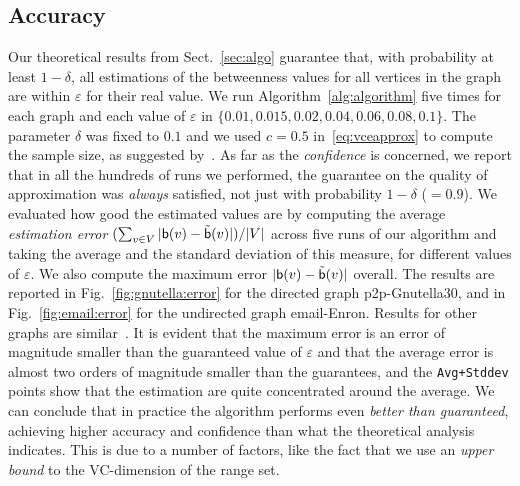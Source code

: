 \subsection{Accuracy}\label{sec:accuracy}
Our theoretical results from Sect.~\ref{sec:algo} guarantee that, with probability
at least $1-\delta$, all estimations of the betweenness values for all vertices
in the graph are within $\varepsilon$ for their real value. %
We run Algorithm~\ref{alg:algorithm} five times for each graph and each value of
$\varepsilon$ in $\{0.01, 0.015, 0.02, 0.04, 0.06, 0.08, 0.1\}$. The parameter
$\delta$ was fixed to $0.1$ and we used $c=0.5$ in~\eqref{eq:vceapprox} to
compute the sample size, as suggested by~\citet{LofflerP09}. As far as the
\emph{confidence} is concerned, we report that in all the hundreds of runs we
performed, the guarantee on the quality of approximation was \emph{always} satisfied, not just
with probability $1-\delta$ ($=0.9$). We evaluated how good the estimated values
are by computing the average \emph{estimation error} $(\sum_{v\in
V}|\mathsf{b}(v)-\tilde{\mathsf{b}}(v)|)/|V|$ across five runs of our algorithm and taking
the average and the standard deviation of this measure, for different values of
$\varepsilon$. We also compute the maximum error $|\mathsf{b}(v)-\tilde{\mathsf{b}}(v)|$
overall. The results are reported in Fig.~\ref{fig:gnutella:error} for the directed
graph p2p-Gnutella30, and in Fig.~\ref{fig:email:error} for the undirected graph
email-Enron. Results for other graphs are similar~\citep{RiondatoK13}. It is
evident that the maximum error is an error of magnitude smaller than the
guaranteed value of $\varepsilon$ and that the average error is almost two
orders of magnitude smaller than the guarantees, and the \texttt{Avg+Stddev}
points show that the estimation are quite concentrated around the
average. We can conclude that in practice the algorithm performs even \emph{better
than guaranteed}, achieving higher accuracy and confidence than what the
theoretical analysis indicates. This is due to a number of factors, like the
fact that we use an \emph{upper bound} to the VC-dimension of the range set. 

